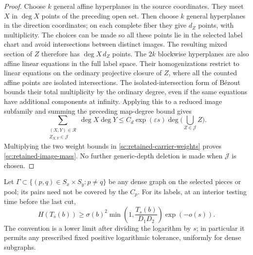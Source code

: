 \begin{proof}
Choose $k$ general affine hyperplanes in the source coordinates.  They
meet $X$ in $\deg X$ points of the preceding open set.  Then choose $k$
general hyperplanes in the direction coordinates; on each complete fiber
they give $d_Z$ points, with multiplicity.  The choices can be made so
all these points lie in the selected label chart and avoid intersections
between distinct images.  The resulting mixed section of $Z$ therefore
has $\deg X\,d_Z$ points.  The $2k$ blockwise hyperplanes are also affine
linear equations in the full label space.  Their homogenizations restrict
to linear equations on the ordinary projective closure of $Z$, where all
the counted affine points are isolated intersections.  The isolated-intersection
form of B\'ezout bounds their total multiplicity by the ordinary degree,
even if the same equations have additional components at infinity.
Applying this to a reduced image subfamily and summing the preceding
map-degree bound gives
\[
 \sum_{\substack{(X,Y)\in\mathcal R\\Z_{X,Y}\in\mathcal J}}
       \deg X\deg Y
 \le C_d\exp(\varepsilon s)
       \deg\bigl(\bigcup_{Z\in\mathcal J}Z\bigr).
\]
Multiplying the two weight bounds in
\eqref{sc:retained-carrier-weights} proves
\eqref{sc:retained-image-mass}.  No further generic-depth deletion is
made when $\mathcal J$ is chosen.
\end{proof}

\begin{lemma}\label{sc:common-rank}
Let $\Gamma\subset\{(p,q)\in S_x\times S_y:p\ne q\}$ be any dense graph
on the selected pieces or pool; its pairs need not be covered by the $C_p$.
For its labels, at an interior testing time
before the last cut,
\begin{equation}\label{sc:label-rank}
 H(T_s(b))\ge
 \sigma(b)^2\min\left(1,\frac{T_s(b)}{D_1D_2}\right)
 \exp(-o(s)).
\end{equation}
The convention is a lower limit after dividing the logarithm
by $s$; in particular it permits any prescribed fixed positive
logarithmic tolerance, uniformly for dense subgraphs.
\end{lemma}

